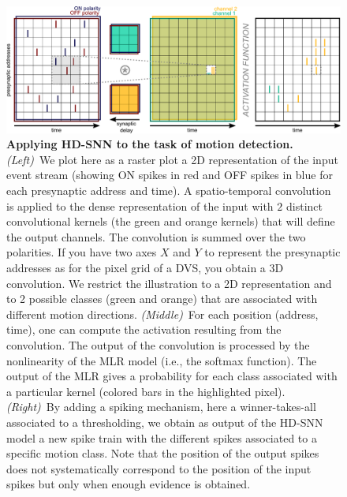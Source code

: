\documentclass[default]{sn-jnl}%
\theoremstyle{thmstyleone}%
\theoremstyle{thmstyletwo}%
\theoremstyle{thmstylethree}%
\begin{document}
\begin{figure}%
    \centering
    \includegraphics[width=\linewidth]{figures/HDSNN_conv.pdf}
    \caption{
    \textbf{Applying HD-SNN to the task of motion detection.} \textit{(Left)}~We plot here as a raster plot a 2D representation of the input event stream (showing ON spikes in red and OFF spikes in blue for each presynaptic address and time). A spatio-temporal convolution is applied to the dense representation of the input with $2$ distinct convolutional kernels (the green and orange kernels) that will define the output channels. The convolution is summed over the two polarities. If you have two axes $X$ and $Y$ to represent the presynaptic addresses as for the pixel grid of a DVS, you obtain a 3D convolution. We restrict the illustration to a 2D representation and to 2 possible classes (green and orange) that are associated with different motion directions. \textit{(Middle)}~For each position (address, time), one can compute the activation resulting from the convolution. The output of the convolution is processed by the nonlinearity of the MLR model (i.e., the softmax function). The output of the MLR gives a probability for each class associated with a particular kernel (colored bars in the highlighted pixel). \textit{(Right)}~By adding a spiking mechanism, here a winner-takes-all associated to a thresholding, we obtain as output of the HD-SNN model a new spike train with the different spikes associated to a specific motion class. Note that the position of the output spikes does not systematically correspond to the position of the input spikes but only when enough evidence is obtained.}
    \label{fig:model}
\end{figure}
\end{document}
